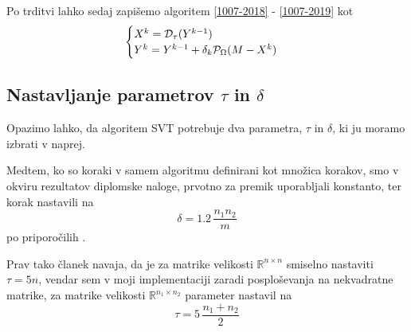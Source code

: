 Po trditvi lahko sedaj zapišemo algoritem \eqref{1007-2018} - \eqref{1007-2019} kot \cite{CCS}
\[
    \begin{cases}
        X^k = \mathcal{D}_\tau(Y^{k-1}) \\
        Y^k = Y^{k-1} + \delta_k \mathcal{P}_\Omega(M - X^k) 
    \end{cases}
\]

\subsection{Nastavljanje parametrov $\tau$ in $\delta$} \label{1907-1648}
Opazimo lahko, da algoritem SVT potrebuje dva parametra, $\tau$ in $\delta$, ki ju moramo izbrati v naprej.

Medtem, ko so koraki v samem algoritmu definirani kot množica korakov, 
smo v okviru rezultatov diplomske naloge, prvotno za premik uporabljali konstanto, ter korak nastavili na 
\[
    \delta = 1.2\, \dfrac{n_1 n_2}{m}
\] po priporočilih \cite{CCS}. 

Prav tako članek \cite{CCS} navaja, da je za matrike velikosti $\mathbb{R}^{n \times n}$ smiselno nastaviti $\tau = 5n$, vendar sem v moji implementaciji zaradi posploševanja na nekvadratne matrike, za matrike velikosti $\mathbb{R}^{n_1 \times n_2}$ parameter nastavil na
\[
    \tau = 5\, \frac{n_1+n_2}{2}
\]

